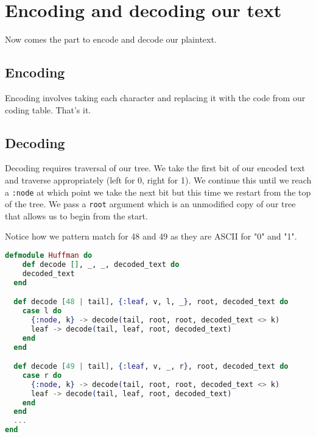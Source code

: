 \section{Encoding and decoding our text}
Now comes the part to encode and decode our plaintext.

\subsection{Encoding}
Encoding involves taking each character and replacing it with the code from our coding table. That's it.


\subsection{Decoding}
Decoding requires traversal of our tree. We take the first bit of our encoded text and traverse appropriately (left for 0, right for 1). We continue this until we reach a \texttt{:node} at which point we take the next bit but this time we restart from the top of the tree. We pass a \texttt{root} argument which is an unmodified copy of our tree that allows us to begin from the start.

Notice how we pattern match for 48 and 49 as they are ASCII for "0" and "1".

\begin{lstlisting}[language=Elixir, title=Decoding]
defmodule Huffman do  
    def decode [], _, _, decoded_text do
    decoded_text
  end

  def decode [48 | tail], {:leaf, v, l, _}, root, decoded_text do
    case l do
      {:node, k} -> decode(tail, root, root, decoded_text <> k)
      leaf -> decode(tail, leaf, root, decoded_text)
    end
  end

  def decode [49 | tail], {:leaf, v, _, r}, root, decoded_text do
    case r do
      {:node, k} -> decode(tail, root, root, decoded_text <> k)
      leaf -> decode(tail, leaf, root, decoded_text)
    end
  end
  ...
end
\end{lstlisting}